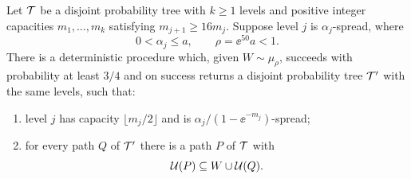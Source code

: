 \begin{lemma}[Reduction]\label{lem:reduction}
Let $\mathcal T$ be a disjoint probability tree with $k\ge1$ levels and positive integer
capacities $m_1,\ldots,m_k$ satisfying $m_{j+1}\ge16m_j$.
Suppose level $j$ is $\alpha_j$-spread, where
\[
 0<\alpha_j\le a,\qquad \rho=\ee^{50}a<1.
\]
There is a deterministic procedure which, given $W\sim\mu_\rho$,
succeeds with probability at least $3/4$ and on success returns a
disjoint probability tree $\mathcal T'$ with the same levels, such that:
\begin{enumerate}[label=(\roman*),leftmargin=2.2em,itemsep=3pt]
 \item level $j$ has capacity $\lfloor m_j/2\rfloor$ and is
 $\alpha_j/(1-\ee^{-m_j})$-spread;
 \item for every path $Q$ of $\mathcal T'$ there is a path $P$ of $\mathcal T$ with
 \begin{equation}\label{eq:recovery}
   \mathcal U(P)\subseteq W\cup\mathcal U(Q).
 \end{equation}
\end{enumerate}
\end{lemma}

